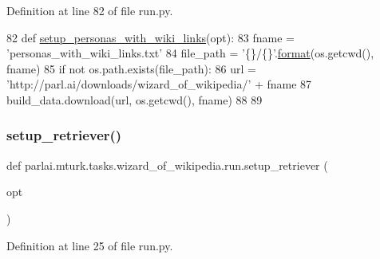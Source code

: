 Definition at line 82 of file run.\+py.


\begin{DoxyCode}
82 \textcolor{keyword}{def }\hyperlink{namespaceparlai_1_1mturk_1_1tasks_1_1wizard__of__wikipedia_1_1run_a5c16caa932230f93c418facd793be473}{setup\_personas\_with\_wiki\_links}(opt):
83     fname = \textcolor{stringliteral}{'personas\_with\_wiki\_links.txt'}
84     file\_path = \textcolor{stringliteral}{'\{\}/\{\}'}.\hyperlink{namespaceparlai_1_1chat__service_1_1services_1_1messenger_1_1shared__utils_a32e2e2022b824fbaf80c747160b52a76}{format}(os.getcwd(), fname)
85     \textcolor{keywordflow}{if} \textcolor{keywordflow}{not} os.path.exists(file\_path):
86         url = \textcolor{stringliteral}{'http://parl.ai/downloads/wizard\_of\_wikipedia/'} + fname
87         build\_data.download(url, os.getcwd(), fname)
88 
89 
\end{DoxyCode}
\mbox{\label{namespaceparlai_1_1mturk_1_1tasks_1_1wizard__of__wikipedia_1_1run_a22eb017ecd8f1a211fc5aac511d3102e}} 
\subsubsection{\texorpdfstring{setup\+\_\+retriever()}{setup\_retriever()}}
{\footnotesize\ttfamily def parlai.\+mturk.\+tasks.\+wizard\+\_\+of\+\_\+wikipedia.\+run.\+setup\+\_\+retriever (\begin{DoxyParamCaption}\item[{}]{opt }\end{DoxyParamCaption})}



Definition at line 25 of file run.\+py.


